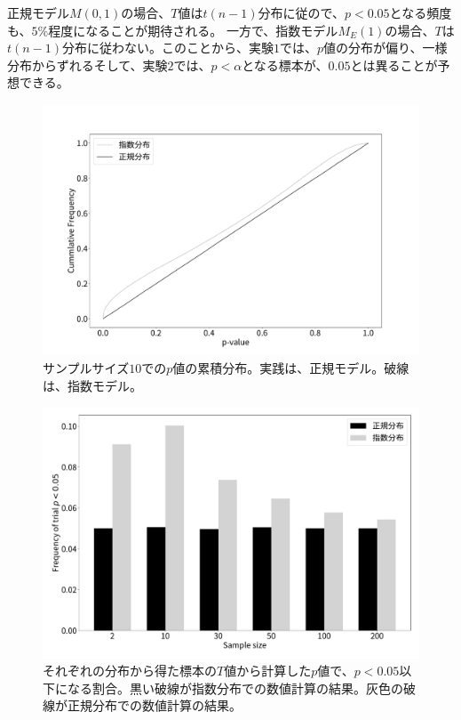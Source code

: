 正規モデル$M(0,1)$の場合、$T$値は$t(n-1)$分布に従ので、$p<0.05$となる頻度も、$5\%$程度になることが期待される。
一方で、指数モデル$M_E(1)$の場合、$T$は$t(n-1)$分布に従わない。このことから、実験$1$では、$p$値の分布が偏り、一様分布からずれるそして、実験$2$では、$p<\alpha$となる標本が、$0.05$とは異ることが予想できる。

\begin{figure}
 \begin{center}
  \includegraphics[width=15cm]{./image/04_/N_10_Exponn_T_test.pdf}
 \caption{サンプルサイズ$10$での$p$値の累積分布。実践は、正規モデル。破線は、指数モデル。}
  \label{fig:model_dependent_T_test}
 \end{center}
\end{figure}


\begin{figure}
 \begin{center}
  \includegraphics[width=15cm]{./image/04_/expon_T_test_expon_norm.pdf}
  \caption{それぞれの分布から得た標本の$T$値から計算した$p$値で、$p<0.05$以下になる割合。黒い破線が指数分布での数値計算の結果。灰色の破線が正規分布での数値計算の結果。}
  \label{fig:t_test_expon_norm}
 \end{center}
\end{figure}

